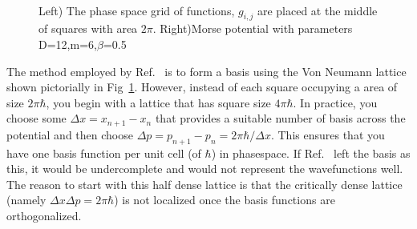\begin{figure}[!ht]
\centering
\mbox{
}
\caption[The four (SP;1000) wavefunctions]{Left) The phase space grid of functions, $g_{i,j}$ are placed at the middle of squares with area $2\pi$. Right)Morse potential with parameters D=12,m=6,$\beta$=0.5} 
\label{fig.morse}
\end{figure}


The method employed by Ref.~ is to form a basis using the Von Neumann lattice shown pictorially in Fig~\ref{fig.morse}. However, instead of each square occupying a area of size $2\pi\hbar$, you begin with a lattice that has square size $4\pi\hbar$.  In practice, you choose some $\Delta x=x_{n+1}-x_n$ that provides a suitable number of basis across the potential and then choose $\Delta p=p_{n+1}-p_n=2\pi \hbar/\Delta x$.  This ensures that you have one basis function per unit cell (of $\hbar$) in phasespace.  If Ref.~ left the basis as this, it would be undercomplete and would not represent the wavefunctions well.  The reason to start with this half dense lattice is that the critically dense lattice (namely $\Delta x\Delta p=2\pi\hbar$) is not localized once the basis functions are orthogonalized\cite{Poirier2004}.

